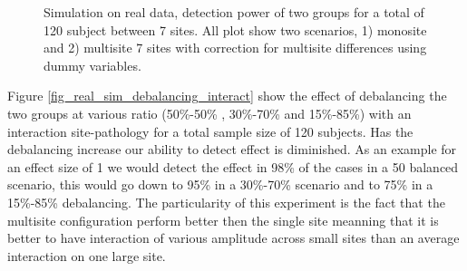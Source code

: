 \documentclass[authoryear]{elsarticle}
\begin{document}
\begin{figure}[H!]
\centering
\captionsetup[subfloat]{labelformat=empty}
\hspace{1mm}
\hspace{1mm}
\hspace{1mm}
\tiny Simulation on real data, detection power of two groups for a total of 120 subject between 7 sites. All plot show two scenarios, 1) monosite and 2) multisite 7 sites with correction for multisite differences using dummy variables.
\label{fig_real_sim_debalancing}
\end{figure}

Figure \ref{fig_real_sim_debalancing_interact} show the effect of debalancing the two groups at various ratio (50\%-50\% , 30\%-70\% and 15\%-85\%) with an interaction site-pathology for a total sample size of 120 subjects. Has the debalancing increase our ability to detect effect is diminished. As an example for an effect size of 1 we would detect the effect in 98\% of the cases in a 50 balanced scenario, this would go down to 95\% in a 30\%-70\% scenario and to 75\% in a 15\%-85\% debalancing. The particularity of this experiment is the fact that the multisite configuration perform better then the single site meanning that it is better to have interaction of various amplitude across small sites than an average interaction on one large site.
\end{document}
